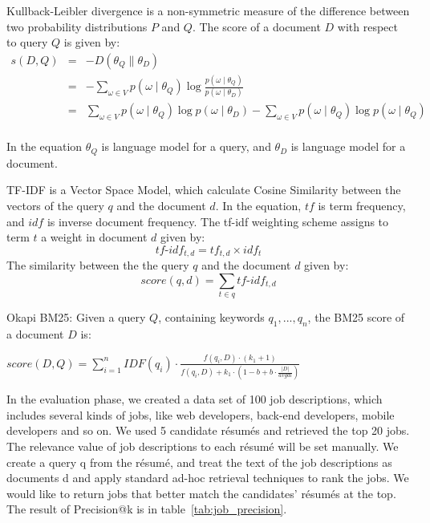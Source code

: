 Kullback-Leibler divergence is a non-symmetric measure of the difference between two probability distributions $P$ and $Q$. The score of a document $D$ with respect to query $Q$ is given by:
\begin{equation}
    \begin{array}{rcl}
        s(D,Q) & = & -D( \theta_Q \parallel  \theta_D )\\
               & = &- \sum_{ \omega \in V } p (\omega \mid \theta_Q) \log \frac{ p (\omega \mid \theta_Q )}{p(\omega \mid \theta_D)} \\
               & = & \sum_{ \omega \in V } p (\omega \mid \theta_Q) \log p (\omega \mid \theta_D ) -  \sum_{ \omega \in V } p (\omega \mid \theta_Q) \log p (\omega \mid \theta_Q )  \\

    \end{array}
\end{equation}

In the equation $\theta_Q$ is language model for a query, and  $\theta_D$ is language model for a document.

TF-IDF is a Vector Space Model, which calculate Cosine Similarity between the vectors of the query $q$ and the document $d$. In the equation, $tf$ is term frequency, and $idf$ is inverse document frequency. The tf-idf weighting scheme assigns to term $t$ a weight in document $d$ given by:
$$ tf\text{-}idf_{t,d} = tf_{t,d} \times idf_{t} $$
The similarity between the  the query $q$ and the document $d$ given by:
$$ score(q,d) =  \sum_{t \in q }  tf\text{-}idf_{t,d} $$

Okapi BM25: Given a query $Q$, containing keywords $q_1, ..., q_n$, the BM25 score of a document $D$ is:

$ score(D,Q) = \sum_{ i=1 }^{n} IDF(q_i) \cdot   \frac {f(q_i,D) \cdot (k_1 + 1)}{f(q_i,D) + k_1 \cdot ( 1-b + b\cdot \frac { \left | D \right |}{avgdl})}  $

In the evaluation phase, we created a data set of 100 job descriptions, which includes several kinds of jobs, like web developers, back-end developers, mobile developers and so on. We used 5 candidate r\'esum\'es and retrieved the top 20 jobs.  The relevance value of job descriptions to each r\'esum\'e will be set manually. We create a query q from the r\'esum\'e, and treat the text of the job descriptions as documents d and apply standard ad-hoc retrieval techniques to rank the jobs. We would like to return jobs that better match the candidates' r\'esum\'es at the top. The result of Precision@k is in table~\ref{tab:job_precision}.


